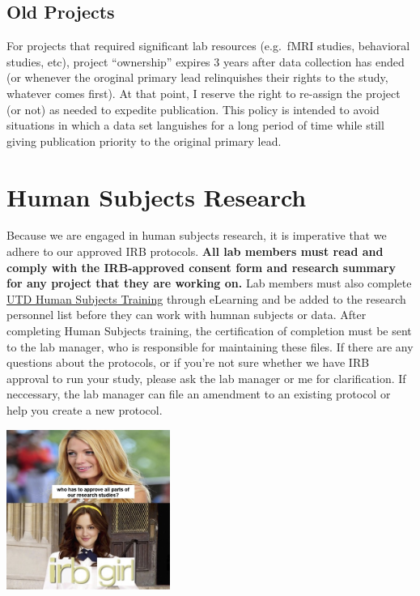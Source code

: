 \documentclass[]{book}
\begin{document}
\hypertarget{old-projects}{%
\subsection{Old Projects}\label{old-projects}}

For projects that required significant lab resources (e.g.~fMRI studies, behavioral studies, etc), project ``ownership'' expires 3 years after data collection has ended (or whenever the oroginal primary lead relinquishes their rights to the study, whatever comes first). At that point, I reserve the right to re-assign the project (or not) as needed to expedite publication. This policy is intended to avoid situations in which a data set languishes for a long period of time while still giving publication priority to the original primary lead.

\hypertarget{human-subjects-research}{%
\section{Human Subjects Research}\label{human-subjects-research}}

Because we are engaged in human subjects research, it is imperative that we adhere to our approved IRB protocols. \textbf{All lab members must read and comply with the IRB-approved consent form and research summary for any project that they are working on.} Lab members must also complete \href{https://research.utdallas.edu/researchers/human-subjects-research/forms-and-resources/training-and-workshops}{UTD Human Subjects Training} through eLearning and be added to the research personnel list before they can work with humnan subjects or data. After completing Human Subjects training, the certification of completion must be sent to the lab manager, who is responsible for maintaining these files. If there are any questions about the protocols, or if you're not sure whether we have IRB approval to run your study, please ask the lab manager or me for clarification. If neccessary, the lab manager can file an amendment to an existing protocol or help you create a new protocol.

\includegraphics[width=0.4\textwidth,height=\textheight]{images/gg_irb_meme.jpg}
\end{document}

